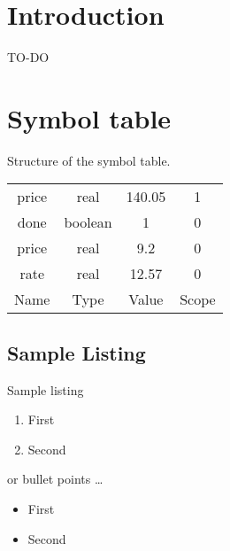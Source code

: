 \documentclass[12pt]{article}
\begin{document}
\section{Introduction}
TO-DO
\vspace{0.5cm}




\section{Symbol table}
Structure of the symbol table.
\vspace{0.3cm}
\begin{table}[h!]
\centering
\begin{tabular}{c|c|c|c}
price & real & 140.05 & 1 \\
done & boolean & 1 & 0 \\
price & real & 9.2 & 0 \\
rate & real & 12.57 & 0 \\
\hline
Name & Type & Value & Scope
\end{tabular}
\end{table}
\vspace{0.5cm}




\subsection{Sample Listing}
Sample listing
\begin{enumerate}
\item First
\item Second
\end{enumerate}
or bullet points \dots
\begin{itemize}
\item First
\item Second
\end{itemize}




\end{document}
